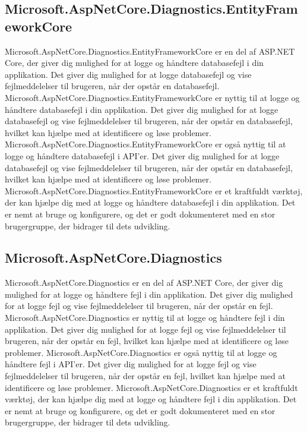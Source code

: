 \subsection{Microsoft.AspNetCore.Diagnostics.EntityFrameworkCore}
Microsoft.AspNetCore.Diagnostics.EntityFrameworkCore er en del af ASP.NET Core, der giver dig mulighed for at logge og håndtere databasefejl i din applikation. Det giver dig mulighed for at logge databasefejl og vise fejlmeddelelser til brugeren, når der opstår en databasefejl.
Microsoft.AspNetCore.Diagnostics.EntityFrameworkCore er nyttig til at logge og håndtere databasefejl i din applikation. Det giver dig mulighed for at logge databasefejl og vise fejlmeddelelser til brugeren, når der opstår en databasefejl, hvilket kan hjælpe med at identificere og løse problemer.
Microsoft.AspNetCore.Diagnostics.EntityFrameworkCore er også nyttig til at logge og håndtere databasefejl i API'er. Det giver dig mulighed for at logge databasefejl og vise fejlmeddelelser til brugeren, når der opstår en databasefejl, hvilket kan hjælpe med at identificere og løse problemer.
Microsoft.AspNetCore.Diagnostics.EntityFrameworkCore er et kraftfuldt værktøj, der kan hjælpe dig med at logge og håndtere databasefejl i din applikation. Det er nemt at bruge og konfigurere, og det er godt dokumenteret med en stor brugergruppe, der bidrager til dets udvikling.

\subsection{Microsoft.AspNetCore.Diagnostics}
Microsoft.AspNetCore.Diagnostics er en del af ASP.NET Core, der giver dig mulighed for at logge og håndtere fejl i din applikation. Det giver dig mulighed for at logge fejl og vise fejlmeddelelser til brugeren, når der opstår en fejl.
Microsoft.AspNetCore.Diagnostics er nyttig til at logge og håndtere fejl i din applikation. Det giver dig mulighed for at logge fejl og vise fejlmeddelelser til brugeren, når der opstår en fejl, hvilket kan hjælpe med at identificere og løse problemer.
Microsoft.AspNetCore.Diagnostics er også nyttig til at logge og håndtere fejl i API'er. Det giver dig mulighed for at logge fejl og vise fejlmeddelelser til brugeren, når der opstår en fejl, hvilket kan hjælpe med at identificere og løse problemer.
Microsoft.AspNetCore.Diagnostics er et kraftfuldt værktøj, der kan hjælpe dig med at logge og håndtere fejl i din applikation. Det er nemt at bruge og konfigurere, og det er godt dokumenteret med en stor brugergruppe, der bidrager til dets udvikling.

